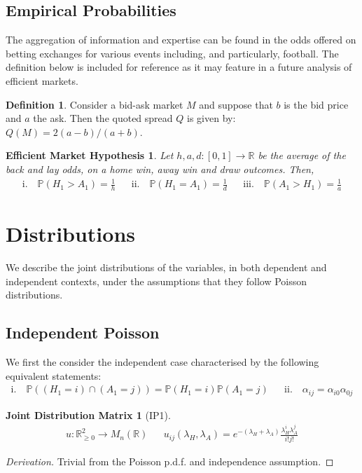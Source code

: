 \documentclass[a4paper,11pt,oneside]{book}
\theoremstyle{plain}
\newtheorem*{emh}{Efficient Market Hypothesis}
\newtheorem*{jdm}{Joint Distribution Matrix}
\theoremstyle{definition}
\newtheorem{defn}{Definition}[section]
\begin{document}
\subsection{Empirical Probabilities}
The aggregation of information and expertise can be found in the odds offered on betting exchanges for various events including, and particularly, football. The definition below is included for reference as it may feature in a future analysis of efficient markets.
\begin{defn}
Consider a bid-ask market $M$ and suppose that $b$ is the bid price and $a$ the ask. Then the quoted spread $Q$ is given by:
$Q(M)=2(a-b)/(a+b)$.
\end{defn}
\begin{emh}
Let $h,a,d:[0,1]\rightarrow \mathbb{R}$ be the average of the back and lay odds, on a home win, away win and draw outcomes. Then,
\begin{align*}
\text{i.} \quad \mathbb{P}(H_1>A_1)=\frac{1}{h} && \text{ii.} \quad\mathbb{P}(H_1=A_1)=\frac{1}{d} && \text{iii.} \quad\mathbb{P}(A_1>H_1)=\frac{1}{a}
\end{align*}
\end{emh}
\section{Distributions }
We describe the joint distributions of the variables, in both dependent and independent contexts, under the assumptions that they follow Poisson distributions.
\subsection{Independent Poisson}
We first the consider the independent case characterised by the following equivalent statements:
\begin{align*}
\text{i.} \quad \mathbb{P}((H_1=i)\cap (A_1=j))=\mathbb{P}(H_1=i)\mathbb{P} (A_1=j) && \text{ii.} \quad\alpha_{ij}=\alpha_{i0}\alpha_{0j}
\end{align*}
\begin{jdm}[IP1]
\begin{align*}
u: \mathbb{R}^2_{\ge 0} \rightarrow M_n(\mathbb{R}) && u_{ij}(\lambda_H,\lambda_A)=e^{-(\lambda_H+\lambda_A)}\frac{\lambda_H^i\lambda_A^j}{i!j!}
\end{align*}
\end{jdm}
\begin{proof}[Derivation]
Trivial from the Poisson p.d.f. and independence assumption.
\end{proof}
\end{document}
